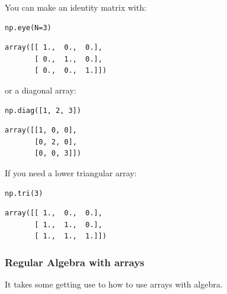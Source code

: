 \documentclass[11pt]{article}
\begin{document}
You can make an identity matrix with:

\begin{verbatim}
np.eye(N=3)
\end{verbatim}

\begin{verbatim}
array([[ 1.,  0.,  0.],
       [ 0.,  1.,  0.],
       [ 0.,  0.,  1.]])
\end{verbatim}

or a diagonal array:

\begin{verbatim}
np.diag([1, 2, 3])
\end{verbatim}

\begin{verbatim}
array([[1, 0, 0],
       [0, 2, 0],
       [0, 0, 3]])
\end{verbatim}

If you need a lower triangular array:

\begin{verbatim}
np.tri(3)
\end{verbatim}

\begin{verbatim}
array([[ 1.,  0.,  0.],
       [ 1.,  1.,  0.],
       [ 1.,  1.,  1.]])
\end{verbatim}


\subsubsection{Regular Algebra with arrays}
\label{sec:orgfcd8ac2}

It takes some getting use to how to use arrays with algebra.
\end{document}
